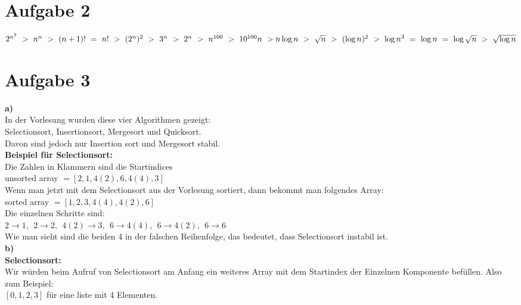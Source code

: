 \documentclass[12pt,a4paper,headsepline]{scrreprt}
\begin{document}





\section*{Aufgabe 2}
$2^{n^2}~>~n^n~>~(n+1)!~=~n!~>~(2^n)^2~>~3^n~>~2^n~>~n^{100}~>~10^{100}n~>~\\n\log n~>~\sqrt{n}~>~(\log n)^2~>~\log n^3~=~\log n~=~\log \sqrt{n}~>~\sqrt{\log n}$

\section*{Aufgabe 3}
\textbf{a)}\\
In der Vorlesung wurden diese vier Algorithmen gezeigt:\\
Selectionsort, Insertionsort, Mergesort und Quicksort.\\
Davon sind jedoch nur Insertion sort und Mergesort stabil.\\

\textbf{Beispiel für Selectionsort:}\\
Die Zahlen in Klammern sind die Startindices\\

unsorted array $=[2,1,4(2),6,4(4),3]$\\

Wenn man jetzt mit dem Selectionsort aus der Vorlesung sortiert, dann bekommt man folgendes Array:\\
sorted array $=[1,2,3,4(4),4(2),6]$\\

Die einzelnen Schritte sind:\\
$2\rightarrow1,~~ 2\rightarrow2,~~ 4(2)\rightarrow3,~~ 6\rightarrow4(4),~~ 6\rightarrow4(2),~~ 6\rightarrow6$\\

Wie man sieht sind die beiden 4 in der falschen Reihenfolge, das bedeutet, dass Selectionsort instabil ist.\\

\textbf{b)}\\
\textbf{Selectionsort:}\\
Wir würden beim Aufruf von Selectionsort am Anfang ein weiteres Array mit dem Startindex der Einzelnen Komponente befüllen.
Also zum Beispiel:\\
$[0,1,2,3]$ für eine liste mit 4 Elementen.\\
\end{document}
